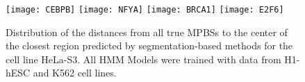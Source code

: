 \documentclass[11pt,a4]{article}
\begin{document}
\begin{figure}[h]
\centering
    \texttt{[image: CEBPB]}
    \texttt{[image: NFYA]}
    \texttt{[image: BRCA1]}
    \texttt{[image: E2F6]}
\caption{Distribution of the distances from all true MPBSs to the center of the closest region predicted by segmentation-based methods for the cell line HeLa-S3. All HMM Models were trained with data from H1-hESC and K562 cell lines.}
\label{fig:boxplot.HeLaS3.fdr_4.6}
\end{figure}
\end{document}
